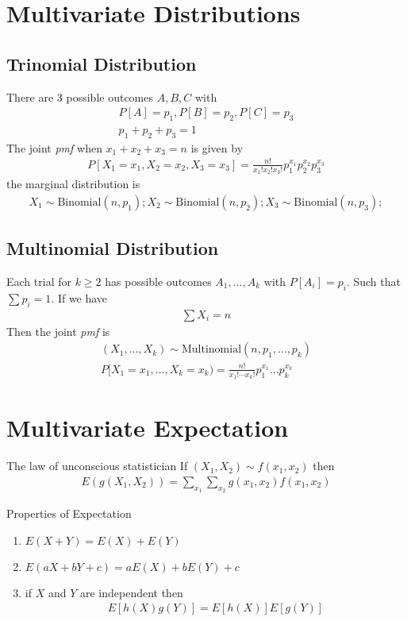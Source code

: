 \documentclass[16pt,a4paper]{article}
\begin{document}
\section{Multivariate Distributions}
\subsection{Trinomial Distribution}
There are 3 possible outcomes $A,B,C$ with 
\begin{align*}
P[A] = p_1, P[B] = p_2, P[C] = p_3\\
p_1+p_2+p_3 = 1
\end{align*} 
The joint \textit{pmf} when $x_1+x_2 +x_3 = n$ is given by 
\begin{align*}
P[X_1 = x_1, X_2 = x_2, X_3 = x_3] = \frac{n!}{x_1!x_2!x_3!}p_1^{x_1}p_2^{x_2}p_3^{x_3}
\end{align*}
the marginal distribution is
\begin{align*}
X_1 \sim \text{Binomial}(n,p_1);
X_2 \sim \text{Binomial}(n,p_2);
X_3 \sim \text{Binomial}(n,p_3);
\end{align*} 
\subsection{Multinomial Distribution}
Each trial for $k\geq 2$ has possible outcomes $A_1, \ldots, A_k$ with $P[A_i] = p_i$. Such that $\sum p_i = 1$. If we have 
\begin{align*}
\sum X_i = n
\end{align*}
Then the joint \textit{pmf} is 
\begin{align*}
(X_1, \ldots, X_k) \sim \text{Multinomial}(n, p_1, \ldots, p_k)\\
P[X_1 = x_1, \ldots, X_k = x_k) =  \frac{n!}{x_1!\cdots x_k!}p_1^{x_1}\ldots p_k^{x_k}
\end{align*}
\newpage
\section{Multivariate Expectation}
\begin{thm}{The law of unconscious statistician}
If $(X_1, X_2)\sim f(x_1, x_2)$ then 
\begin{align*}
E(g(X_1, X_2)) = \sum_{x_1}\sum_{x_2}g(x_1, x_2)f(x_1,x_2)
\end{align*}
\end{thm}

\begin{thm}{Properties of Expectation}
\begin{enumerate}[(1)]
\item $E(X+Y) = E(X) + E(Y)$
\item $E(aX+bY + c) = aE(X) + bE(Y) + c$
\item if $X$ and $Y$ are independent then 
\begin{align*}
E[h(X)g(Y)] = E[h(X)]E[g(Y)]
\end{align*}
\end{enumerate}
\end{thm}
\end{document}
